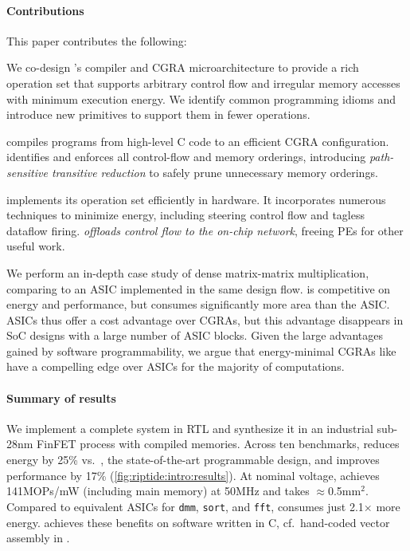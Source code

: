 \paragraph{Contributions}
This paper contributes the following:
\begin{compactitem}

\item {} We co-design \riptide's
  compiler and CGRA microarchitecture to provide a rich operation set
  that supports arbitrary control flow and irregular memory accesses
  with minimum execution energy.
  We identify common programming idioms and introduce new primitives
  to support them in fewer operations.
  
\item {} \riptide compiles programs from high-level C code
  to an efficient CGRA configuration. \riptide identifies and enforces all
  control-flow and memory orderings, introducing \emph{path-sensitive
  transitive reduction} to safely prune unnecessary memory orderings.
  
\item {} \riptide implements its operation set
  efficiently in hardware. It incorporates numerous techniques to
  minimize energy, including steering control flow and tagless
  dataflow firing. \riptide \emph{offloads control flow to the
  on-chip network}, freeing PEs for other useful work.
  
\item {} We perform
  an in-depth case study of dense matrix-matrix multiplication,
  comparing \riptide to an ASIC implemented in the same design flow. \riptide
  is competitive on energy and performance, but consumes significantly
  more area than the ASIC.
  ASICs thus offer a cost advantage over CGRAs, but this
  advantage disappears in SoC designs with a large number of ASIC
  blocks. Given the large advantages gained by software
  programmability, we argue that energy-minimal CGRAs like \riptide have a
  compelling edge over ASICs for the majority of computations.
\end{compactitem}

\paragraph{Summary of results}
%
We implement a complete \riptide system in RTL and synthesize it in an
industrial sub-28nm FinFET process with compiled memories.
%
Across ten benchmarks, \riptide reduces energy by
25\% vs.\ \snafu, the state-of-the-art programmable design,
and improves performance by 17\% (\autoref{fig:riptide:intro:results}).
%
At nominal voltage, \riptide achieves 141MOPs/mW (including main memory) at 50MHz
and takes $\approx$0.5mm$^2$.
%
Compared to equivalent ASICs for {\tt dmm}, {\tt sort}, and {\tt fft},
\riptide consumes just 2.1$\times$ more energy.
%
\riptide achieves these benefits on software written in C, cf.\ hand-coded
vector assembly in \snafu.

